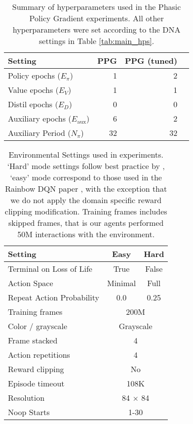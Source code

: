 \documentclass{article}
\begin{document}
\begin{table}[h]
    \centering
    
    \begin{tabular}{l r r r }
    \toprule
        Setting & PPG & PPG (tuned) \\
    \midrule
        Policy epochs ($E_\pi$)           & 1 & 2 \\
        Value epochs ($E_V$)              & 1 & 1 \\
        Distil epochs ($E_D$)             & 0 & 0 \\
        Auxiliary epochs ($E_\text{aux}$) & 6 & 2 \\
        Auxiliary Period ($N_\pi$)        & 32 & 32 \\

    \bottomrule
    \end{tabular}
        
    \caption{Summary of hyperparameters used in the Phasic Policy Gradient experiments. All other hyperparameters were set according to the DNA settings in Table \ref{tab:main_hps}.}
    \label{tab:ppg_hps}
\end{table}

\begin{table}[h]
    \centering
    \begin{tabular}{l c c}
    \toprule
    Setting & Easy & Hard \\
    \midrule
    Terminal on Loss of Life    & True & False \\
    Action Space                & Minimal & Full \\
    Repeat Action Probability   & 0.0 & 0.25  \\
    \midrule
    Training frames             & \multicolumn{2}{c}{200M} \\
    Color / grayscale           & \multicolumn{2}{c}{Grayscale} \\
    Frame stacked               & \multicolumn{2}{c}{4} \\
    Action repetitions          & \multicolumn{2}{c}{4} \\
    Reward clipping             & \multicolumn{2}{c}{No} \\
    Episode timeout             & \multicolumn{2}{c}{108K} \\
    Resolution                  & \multicolumn{2}{c}{84 $\times$ 84} \\
    Noop Starts                 & \multicolumn{2}{c}{1-30} \\
    \bottomrule
    \end{tabular}
    \caption{Environmental Settings used in experiments. `Hard' mode settings follow best practice by \cite{machado2018revisiting}, `easy' mode correspond to those used in the Rainbow DQN paper \cite{hessel2018rainbow}, with the exception that we do not apply the domain specific reward clipping modification. Training  frames includes skipped frames, that is our agents performed 50M interactions with the environment.}
    \label{tab:env_settings}
\end{table}
\end{document}
